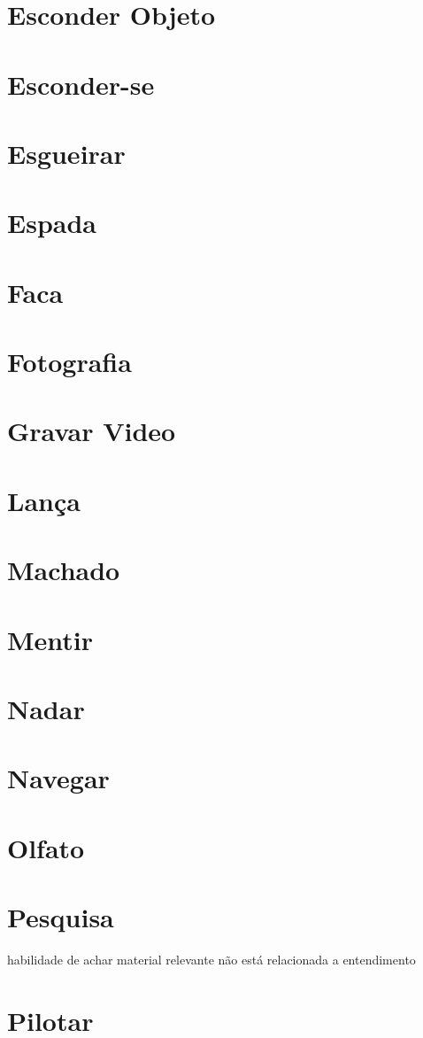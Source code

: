 \section{Esconder Objeto}
\section{Esconder-se}
\section{Esgueirar}
\section{Espada}
\section{Faca}
\section{Fotografia}
\section{Gravar Video}
\section{Lança}
\section{Machado}
\section{Mentir}
\section{Nadar}
\section{Navegar}
\section{Olfato}
\section{Pesquisa} habilidade de achar material relevante não está relacionada a entendimento
\section{Pilotar}

